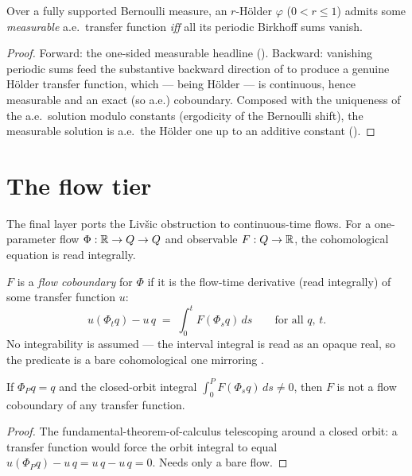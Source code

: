 \begin{theorem}\label{thm:livsic-measurable-full}
  \leanok
  Over a fully supported Bernoulli measure, an \(r\)-Hölder \(\varphi\) (\(0 < r\le 1\)) admits some
  \emph{measurable} a.e.\ transfer function \emph{iff} all its periodic Birkhoff sums vanish.
\end{theorem}
\begin{proof}\leanok
  Forward: the one-sided measurable headline (). Backward:
  vanishing periodic sums feed the substantive backward direction of  to
  produce a genuine Hölder transfer function, which --- being Hölder --- is continuous, hence
  measurable and an exact (so a.e.) coboundary. Composed with the uniqueness of the a.e.\ solution
  modulo constants (ergodicity of the Bernoulli shift), the measurable solution is a.e.\ the Hölder
  one up to an additive constant
  ().
\end{proof}

\section{The flow tier}

The final layer ports the Livšic obstruction to continuous-time flows. For a one-parameter flow
\(\Phi:\mathbb{R}\to Q\to Q\) and observable \(F:Q\to\mathbb{R}\), the cohomological equation is read integrally.

\begin{definition}\label{def:livsic-flowcob}
  \leanok
  \(F\) is a \emph{flow coboundary} for \(\Phi\) if it is the flow-time derivative (read integrally)
  of some transfer function \(u\):
  \[
    u(\Phi_t q) - u\,q \;=\; \int_0^t F(\Phi_s q)\,ds
    \qquad\text{for all } q,\,t.
  \]
  No integrability is assumed --- the interval integral is read as an opaque real, so the predicate
  is a bare cohomological one mirroring .
\end{definition}

\begin{theorem}\label{thm:livsic-flow-obstruction}
  \leanok
  If \(\Phi_P q = q\) and the closed-orbit integral \(\int_0^P F(\Phi_s q)\,ds\ne 0\), then \(F\) is
  not a flow coboundary of any transfer function.
\end{theorem}
\begin{proof}\leanok
  The fundamental-theorem-of-calculus telescoping around a closed orbit: a transfer function would
  force the orbit integral to equal \(u(\Phi_P q) - u\,q = u\,q - u\,q = 0\). Needs only a bare flow.
\end{proof}

